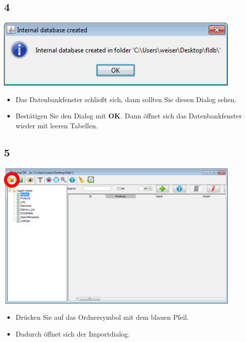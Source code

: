 \documentclass{beamer}
\begin{document}
\subsection{4}
\begin{frame}
	\begin{center}
  		\includegraphics[width=0.9\textwidth]{4.png}
	\end{center}
	\begin{itemize}
		\item Das Datenbankfenster schließt sich, dann sollten Sie diesen Dialog sehen.
		\item Bestätigen Sie den Dialog mit \textbf{OK}. Dann öffnet sich das Datenbankfenster wieder mit leeren Tabellen.
	\end{itemize}
\end{frame}

\subsection{5}
\begin{frame}
	\begin{center}
  		\includegraphics[width=0.9\textwidth]{5.png}
	\end{center}
	\begin{itemize}
		\item Drücken Sie auf das Ordnersymbol mit dem blauen Pfeil.
		\item Dadurch öffnet sich der Importdialog.
	\end{itemize}
\end{frame}
\end{document}
